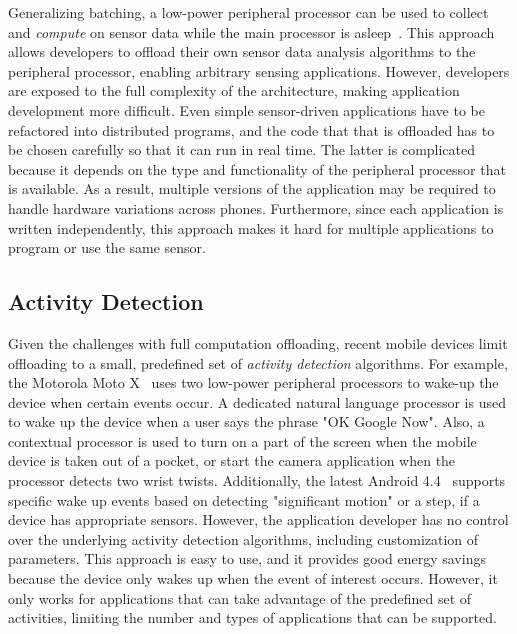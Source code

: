 Generalizing batching, a low-power peripheral processor can be used to
collect and \emph{compute} on sensor data while the main processor is
asleep~\cite{reflex,turducken}.  This approach allows developers to
offload their own sensor data analysis algorithms to the peripheral
processor, enabling arbitrary sensing applications. However,
developers are exposed to the full complexity of the architecture,
making application development more difficult. Even simple
sensor-driven applications have to be refactored into distributed
programs, and the code that that is offloaded has to be chosen
carefully so that it can run in real time. The latter is complicated
because it depends on the type and functionality of the peripheral
processor that is available. As a result, multiple versions of the
application may be required to handle hardware variations across
phones. Furthermore, since each application is written independently,
this approach makes it hard for multiple applications to program or
use the same sensor.


\subsection{Activity Detection}

Given the challenges with full computation offloading, recent mobile
devices limit offloading to a small, predefined set of \emph{activity
  detection} algorithms. For example, the Motorola Moto X~\cite{motox}
uses two low-power peripheral processors to wake-up the device when
certain events occur. A dedicated natural language processor is used
to wake up the device when a user says the phrase "OK Google Now".
Also, a contextual processor is used to turn on a part of the screen
when the mobile device is taken out of a pocket, or start the camera
application when the processor detects two wrist twists. Additionally,
the latest Android 4.4~\cite{android4.4} supports specific wake up
events based on detecting "significant motion" or a step, if a device
has appropriate sensors. However, the application developer has no
control over the underlying activity detection algorithms, including
customization of parameters. This approach is easy to use, and it
provides good energy savings because the device only wakes up when the
event of interest occurs. However, it only works for applications that
can take advantage of the predefined set of activities, limiting the
number and types of applications that can be supported.

